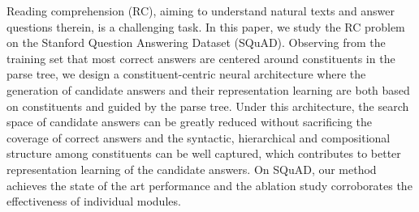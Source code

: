 Reading comprehension (RC), aiming to understand natural texts and answer questions therein, is a challenging task. In this paper, we study the RC problem on the Stanford Question Answering Dataset (SQuAD). Observing from the training set that most correct answers are centered around constituents in the parse tree, we design a constituent-centric neural architecture where the generation of candidate answers and their representation learning are both based on constituents and guided by the parse tree. Under this architecture, the search space of candidate answers can be greatly reduced without sacrificing the coverage of correct answers and the syntactic, hierarchical and compositional structure among constituents can be well captured, which contributes to better representation learning of the candidate answers. On SQuAD, our method achieves the state of the art performance and the ablation study corroborates the effectiveness of individual modules.
